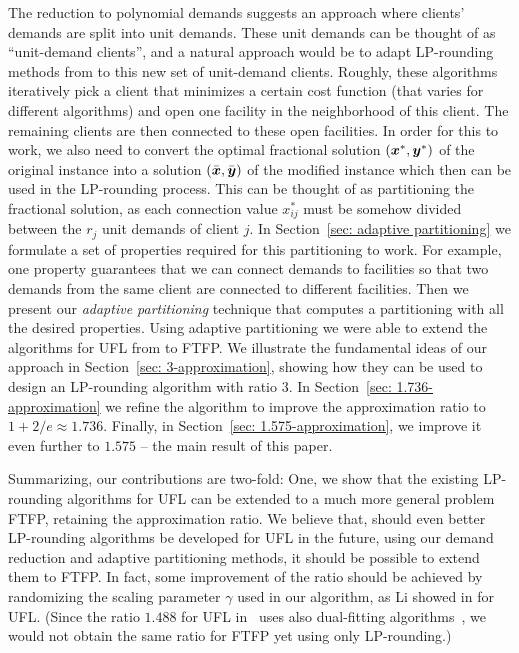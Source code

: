 \documentclass[11pt]{article}
\begin{document}
The reduction to polynomial demands suggests an approach where
clients' demands are split into unit demands. These unit demands can
be thought of as ``unit-demand clients'', and a natural approach would
be to adapt LP-rounding methods from
\cite{gupta08,ChudakS04,ByrkaGS10} to this new set of unit-demand
clients.  Roughly, these algorithms iteratively pick a client that
minimizes a certain cost function (that varies for different
algorithms) and open one facility in the neighborhood of this
client. The remaining clients are then connected to these open
facilities.  In order for this to work, we also need to convert the
optimal fractional solution $(\boldsymbol{x}^\ast,\boldsymbol{y}^\ast)$ of the original
instance into a solution $(\bar{\boldsymbol{x}},\bar{\boldsymbol{y}})$ of the modified instance
which then can be used in the LP-rounding process. This can be thought
of as partitioning the fractional solution, as each connection value
$x^\ast_{ij}$ must be somehow divided between the $r_j$ unit demands
of client $j$. In Section~\ref{sec: adaptive partitioning} we
formulate a set of properties required for this partitioning to
work. For example, one property guarantees that we can connect demands
to facilities so that two demands from the same client are connected
to different facilities. Then we present our \emph{adaptive
  partitioning} technique that computes a partitioning with all the
desired properties. Using adaptive partitioning we were able to extend
the algorithms for UFL from \cite{gupta08,ChudakS04,ByrkaGS10} to
FTFP. We illustrate the fundamental ideas of our approach in
Section~\ref{sec: 3-approximation}, showing how they can be used to
design an LP-rounding algorithm with ratio $3$.  In Section~\ref{sec:
  1.736-approximation} we refine the algorithm to improve the
approximation ratio to $1+2/e\approx 1.736$.  Finally, in
Section~\ref{sec: 1.575-approximation}, we improve it even further to
$1.575$ -- the main result of this paper.

Summarizing, our contributions are two-fold: One, we show
that the existing LP-rounding algorithms for UFL can be
extended to a much more general problem FTFP, retaining the
approximation ratio. We believe that, should even better
LP-rounding algorithms be developed for UFL in the future,
using our demand reduction and adaptive partitioning
methods, it should be possible to extend them to FTFP.
In fact, some improvement of the ratio
should be achieved by randomizing the scaling parameter
$\gamma$ used in our algorithm, as Li showed in \cite{Li11}
for UFL.  (Since the ratio $1.488$ for UFL in~\cite{Li11}
uses also dual-fitting
algorithms~\cite{MahdianYZ06}, we would not obtain the same
ratio for FTFP yet using only LP-rounding.)
\end{document}
